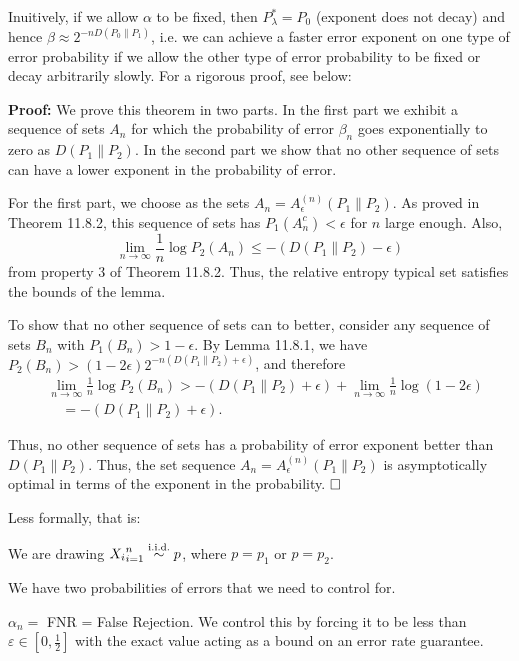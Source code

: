 Inuitively, if we allow $\alpha$ to be fixed, then $P_\lambda^*=P_0$ (exponent does not decay) and hence $\beta \approx 2^{-n D\left(P_0 \| P_1\right)}$, i.e. we can achieve a faster error exponent on one type of error probability if we allow the other type of error probability to be fixed or decay arbitrarily slowly. For a rigorous proof, see below:
\begin{Answer}
\textbf{Proof:} We prove this theorem in two parts. In the first part we exhibit a sequence of sets $A_n$ for which the probability of error $\beta_n$ goes exponentially to zero as $D\left(P_1 \| P_2\right)$. In the second part we show that no other sequence of sets can have a lower exponent in the probability of error.

For the first part, we choose as the sets $A_n=A_\epsilon^{(n)}\left(P_1 \| P_2\right)$. As proved in Theorem 11.8.2, this sequence of sets has $P_1\left(A_n^c\right)<\epsilon$ for $n$ large enough. Also,
$$
\lim _{n \rightarrow \infty} \frac{1}{n} \log P_2\left(A_n\right) \leq-\left(D\left(P_1 \| P_2\right)-\epsilon\right)
$$
from property 3 of Theorem 11.8.2. Thus, the relative entropy typical set satisfies the bounds of the lemma.

To show that no other sequence of sets can to better, consider any sequence of sets $B_n$ with $P_1\left(B_n\right)>1-\epsilon$. By Lemma 11.8.1, we have $P_2\left(B_n\right)>(1-2 \epsilon) 2^{-n\left(D\left(P_1 \| P_2\right)+\epsilon\right)}$, and therefore
$$
\begin{aligned}
& \lim _{n \rightarrow \infty} \frac{1}{n} \log P_2\left(B_n\right)>-\left(D\left(P_1 \| P_2\right)+\epsilon\right)+\lim _{n \rightarrow \infty} \frac{1}{n} \log (1-2 \epsilon) \\
& \quad=-\left(D\left(P_1 \| P_2\right)+\epsilon\right) .
\end{aligned}
$$

Thus, no other sequence of sets has a probability of error exponent better than $D\left(P_1 \| P_2\right)$. Thus, the set sequence $A_n=A_\epsilon^{(n)}\left(P_1 \| P_2\right)$ is asymptotically optimal in terms of the exponent in the probability.
$\hfill\square$
\end{Answer}

Less formally, that is:

We are drawing ${X_i}_{i=1}^n\overset{\text{i.i.d.}}{\sim} p$, where $p=p_1$ or $p=p_2$.

We have two probabilities of errors that we need to control for. 

$\alpha_n = $ FNR = False Rejection. We control this by forcing it to be less than $\varepsilon\in[0, \frac12]$ with the exact value acting as a bound on an error rate guarantee.

